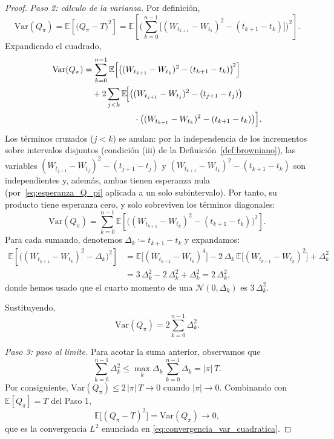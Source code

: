 \documentclass[11pt,a4paper,oneside]{report}
\theoremstyle{plain}
\theoremstyle{definition}
\theoremstyle{remark}
\newcommand{\E}{\mathbb{E}}
\newcommand{\1}{\mathbf{1}}
\newcommand{\eqdef}{\coloneqq}
\begin{document}
\begin{proof}
\emph{Paso 2: cálculo de la varianza.} Por definición,
\begin{equation*}
  \mathrm{Var}(Q_\pi) = \E\!\left[\bigl(Q_\pi - T\bigr)^2\right]
                      = \E\!\left[\biggl(\sum_{k=0}^{n-1}
                          \bigl[(W_{t_{k+1}} - W_{t_k})^2 - (t_{k+1} -
                          t_k)\bigr]\biggr)^{\!2}\right].
\end{equation*}
Expandiendo el cuadrado,
\begin{align*}
  \mathrm{Var}(Q_\pi)
  &= \sum_{k=0}^{n-1} \E\!\left[\bigl((W_{t_{k+1}} - W_{t_k})^2 -
                       (t_{k+1} - t_k)\bigr)^{\!2}\right] \\
  &\quad + 2\sum_{j < k} \E\!\Bigl[\bigl((W_{t_{j+1}} - W_{t_j})^2 -
                  (t_{j+1} - t_j)\bigr) \\
  &\qquad\qquad\qquad \cdot \bigl((W_{t_{k+1}} - W_{t_k})^2 -
                  (t_{k+1} - t_k)\bigr)\Bigr].
\end{align*}
Los términos cruzados ($j < k$) se anulan: por la independencia de los
incrementos sobre intervalos disjuntos (condición (iii) de la
Definición~\ref{def:browniano}), las variables $(W_{t_{j+1}} -
W_{t_j})^2 - (t_{j+1} - t_j)$ y $(W_{t_{k+1}} - W_{t_k})^2 - (t_{k+1} -
t_k)$ son independientes y, además, ambas tienen esperanza nula
(por~\eqref{eq:esperanza_Q_pi} aplicada a un solo subintervalo). Por
tanto, su producto tiene esperanza cero, y solo sobreviven los
términos diagonales:
\begin{equation*}
  \mathrm{Var}(Q_\pi)
  = \sum_{k=0}^{n-1} \E\!\left[\bigl((W_{t_{k+1}} - W_{t_k})^2 -
                       (t_{k+1} - t_k)\bigr)^{\!2}\right].
\end{equation*}
Para cada sumando, denotemos $\Delta_k \eqdef t_{k+1} - t_k$ y
expandamos:
\begin{align*}
  \E\!\left[\bigl((W_{t_{k+1}} - W_{t_k})^2 - \Delta_k\bigr)^{\!2}\right]
  &= \E\bigl[(W_{t_{k+1}} - W_{t_k})^4\bigr]
   - 2\, \Delta_k\, \E\bigl[(W_{t_{k+1}} - W_{t_k})^2\bigr]
   + \Delta_k^2 \\
  &= 3\, \Delta_k^2 - 2\, \Delta_k^2 + \Delta_k^2 = 2\, \Delta_k^2,
\end{align*}
donde hemos usado que el cuarto momento de una $\mathcal{N}(0,
\Delta_k)$ es $3\, \Delta_k^2$.

Sustituyendo,
\begin{equation}\label{eq:varianza_Q_pi}
  \mathrm{Var}(Q_\pi) = 2 \sum_{k=0}^{n-1} \Delta_k^2.
\end{equation}

\emph{Paso 3: paso al límite.} Para acotar la suma anterior, observamos
que
\begin{equation*}
  \sum_{k=0}^{n-1} \Delta_k^2
  \leq \max_k \Delta_k\, \sum_{k=0}^{n-1} \Delta_k
  = |\pi|\, T.
\end{equation*}
Por consiguiente, $\mathrm{Var}(Q_\pi) \leq 2\, |\pi|\, T \to 0$ cuando
$|\pi| \to 0$. Combinando con $\E[Q_\pi] = T$ del Paso 1,
\begin{equation*}
  \E\bigl[(Q_\pi - T)^2\bigr] = \mathrm{Var}(Q_\pi) \to 0,
\end{equation*}
que es la convergencia $L^2$ enunciada en
\eqref{eq:convergencia_var_cuadratica}.
\end{proof}
\end{document}
